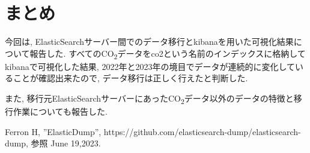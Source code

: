 \documentclass[a4j,12pt,]{jarticle}
\begin{document}
\section{まとめ}
今回は, ElasticSearchサーバー間でのデータ移行とkibanaを用いた可視化結果について報告した.
すべてのCO\textsubscript{2}データをco2という名前のインデックスに格納してkibanaで可視化した結果, 2022年と2023年の境目でデータが連続的に変化していることが確認出来たので, データ移行は正しく行えたと判断した.

また, 移行元ElasticSearchサーバーにあったCO\textsubscript{2}データ以外のデータの特徴と移行作業についても報告した.

\begin{thebibliography}{5}
  Ferron H, ”ElasticDump”, https://github.com/elasticsearch-dump/elasticsearch-dump, 参照 June 19,2023.
\end{thebibliography}
\end{document}
